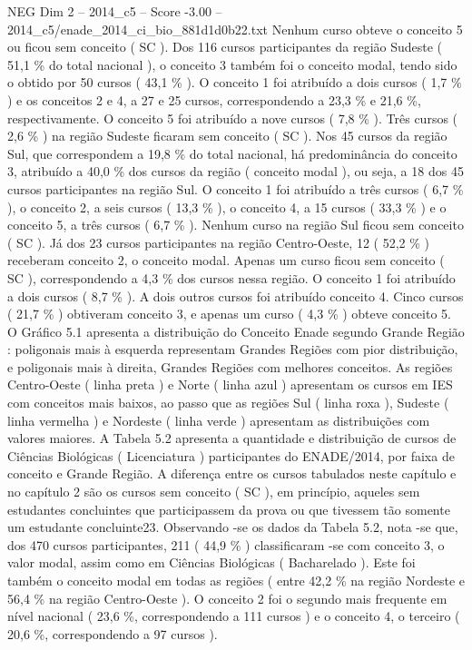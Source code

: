 \begin{textsample}{NEG Dim 2 – 2014\_c5 – Score -3.00 – 2014\_c5/enade\_2014\_ci\_bio\_881d1d0b22.txt}
Nenhum curso obteve o conceito 5 ou ficou sem conceito ( SC ).
Dos 116 cursos participantes da região Sudeste ( 51,1 \% do total nacional ), o conceito 3 também foi o conceito modal, tendo sido o obtido por 50 cursos ( 43,1 \% ).
O conceito 1 foi atribuído a dois cursos ( 1,7 \% ) e os conceitos 2 e 4, a 27 e 25 cursos, correspondendo a 23,3 \% e 21,6 \%, respectivamente.
O conceito 5 foi atribuído a nove cursos ( 7,8 \% ).
Três cursos ( 2,6 \% ) na região Sudeste ficaram sem conceito ( SC ).
Nos 45 cursos da região Sul, que correspondem a 19,8 \% do total nacional, há predominância do conceito 3, atribuído a 40,0 \% dos cursos da região ( conceito modal ), ou seja, a 18 dos 45 cursos participantes na região Sul.
O conceito 1 foi atribuído a três cursos ( 6,7 \% ), o conceito 2, a seis cursos ( 13,3 \% ), o conceito 4, a 15 cursos ( 33,3 \% ) e o conceito 5, a três cursos ( 6,7 \% ).
Nenhum curso na região Sul ficou sem conceito ( SC ).
Já dos 23 cursos participantes na região Centro-Oeste, 12 ( 52,2 \% ) receberam conceito 2, o conceito modal.
Apenas um curso ficou sem conceito ( SC ), correspondendo a 4,3 \% dos cursos nessa região.
O conceito 1 foi atribuído a dois cursos ( 8,7 \% ).
A dois outros cursos foi atribuído conceito 4.
Cinco cursos ( 21,7 \% ) obtiveram conceito 3, e apenas um curso ( 4,3 \% ) obteve conceito 5.
O Gráfico 5.1 apresenta a distribuição do Conceito Enade segundo Grande Região : poligonais mais à esquerda representam Grandes Regiões com pior distribuição, e poligonais mais à direita, Grandes Regiões com melhores conceitos.
As regiões Centro-Oeste ( linha preta ) e Norte ( linha azul ) apresentam os cursos em IES com conceitos mais baixos, ao passo que as regiões Sul ( linha roxa ), Sudeste ( linha vermelha ) e Nordeste ( linha verde ) apresentam as distribuições com valores maiores.
A Tabela 5.2 apresenta a quantidade e distribuição de cursos de Ciências Biológicas ( Licenciatura ) participantes do ENADE/2014, por faixa de conceito e Grande Região.
A diferença entre os cursos tabulados neste capítulo e no capítulo 2 são os cursos sem conceito ( SC ), em princípio, aqueles sem estudantes concluintes que participassem da prova ou que tivessem tão somente um estudante concluinte23.
Observando -se os dados da Tabela 5.2, nota -se que, dos 470 cursos participantes, 211 ( 44,9 \% ) classificaram -se com conceito 3, o valor modal, assim como em Ciências Biológicas ( Bacharelado ).
Este foi também o conceito modal em todas as regiões ( entre 42,2 \% na região Nordeste e 56,4 \% na região Centro-Oeste ).
O conceito 2 foi o segundo mais frequente em nível nacional ( 23,6 \%, correspondendo a 111 cursos ) e o conceito 4, o terceiro ( 20,6 \%, correspondendo a 97 cursos ).

\end{textsample}
